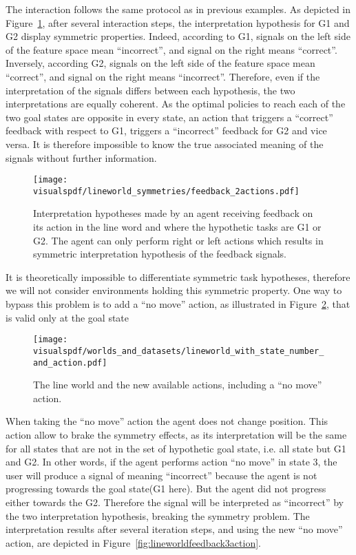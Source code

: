 The interaction follows the same protocol as in previous examples. As depicted in Figure~\ref{fig:lineworldfeedback2action}, after several interaction steps, the interpretation hypothesis for G1 and G2 display symmetric properties. Indeed, according to G1, signals on the left side of the feature space mean ``incorrect'', and signal on the right means ``correct''. Inversely, according G2, signals on the left side of the feature space mean ``correct'', and signal on the right means ``incorrect''. Therefore, even if the interpretation of the signals differs between each hypothesis, the two interpretations are equally coherent. As the optimal policies to reach each of the two goal states are opposite in every state, an action that triggers a ``correct'' feedback with respect to G1, triggers a ``incorrect'' feedback for G2 and vice versa. It is therefore impossible to know the true associated meaning of the signals without further information.

\begin{figure}[!htbp]
  \centering
  \texttt{[image: \\visualspdf/lineworld\_symmetries/feedback\_2actions.pdf]}
  \caption{Interpretation hypotheses made by an agent receiving feedback on its action in the line word and where the hypothetic tasks are G1 or G2. The agent can only perform right or left actions which results in symmetric interpretation hypothesis of the feedback signals.}
  \label{fig:lineworldfeedback2action}
\end{figure}

It is theoretically impossible to differentiate symmetric task hypotheses, therefore we will not consider environments holding this symmetric property. One way to bypass this problem is to add a ``no move'' action, as illustrated in Figure~\ref{fig:lineworld3action}, that is valid only at the goal state

\begin{figure}[!htbp]
  \centering
  \texttt{[image: \\visualspdf/worlds\_and\_datasets/lineworld\_with\_state\_number\_and\_action.pdf]}
  \caption{The line world and the new available actions, including a ``no move'' action.}
  \label{fig:lineworld3action}
\end{figure}

When taking the ``no move'' action the agent does not change position. This action allow to brake the symmetry effects, as its interpretation will be the same for all states that are not in the set of hypothetic goal state, i.e. all state but G1 and G2. In other words, if the agent performs action ``no move'' in state 3, the user will produce a signal of meaning ``incorrect'' because the agent is not progressing towards the goal state(G1 here). But the agent did not progress either towards the G2. Therefore the signal will be interpreted as ``incorrect'' by the two interpretation hypothesis, breaking the symmetry problem. The interpretation results after several iteration steps, and using the new ``no move'' action, are depicted in Figure~\ref{fig:lineworldfeedback3action}.

